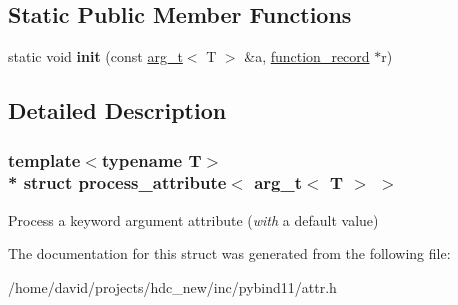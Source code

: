 \subsection*{Static Public Member Functions}
\begin{DoxyCompactItemize}
\item 
static void {\bfseries init} (const \hyperlink{structarg__t}{arg\+\_\+t}$<$ T $>$ \&a, \hyperlink{structfunction__record}{function\+\_\+record} $\ast$r)\hypertarget{structprocess__attribute_3_01arg__t_3_01_t_01_4_01_4_a4133d767f640d9ca30195a0c1a02ef97}{}\label{structprocess__attribute_3_01arg__t_3_01_t_01_4_01_4_a4133d767f640d9ca30195a0c1a02ef97}

\end{DoxyCompactItemize}


\subsection{Detailed Description}
\subsubsection*{template$<$typename T$>$\\*
struct process\+\_\+attribute$<$ arg\+\_\+t$<$ T $>$ $>$}

Process a keyword argument attribute ({\itshape with} a default value) 

The documentation for this struct was generated from the following file\+:\begin{DoxyCompactItemize}
\item 
/home/david/projects/hdc\+\_\+new/inc/pybind11/attr.\+h\end{DoxyCompactItemize}
